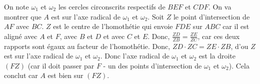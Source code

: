 \begin{sol}
\begin{center}
\end{center}

On note $\omega_1$ et $\omega_2$ les cercles circonscrits respectifs de $BEF$ et $CDF$. On va montrer que $A$ est sur l'axe radical de $\omega_1$ et $\omega_2$. Soit $Z$ le point d'intersection de $AF$ avec $BC$. $Z$ est le centre de l'homothétie qui envoie $FDE$ sur $ABC$ car il est aligné avec $A$ et $F$, avec $B$ et $D$ et avec $C$ et $E$. Donc, $\frac{ZD}{ZB} = \frac{ZE}{ZC}$, car ces deux rapports sont égaux au facteur de l'homothétie. Donc, $ZD \cdot ZC = ZE \cdot ZB$, d'ou $Z$ est sur l'axe radical de $\omega_1$ et $\omega_2$. Donc l'axe radical de $\omega_1$ et $\omega_2$ est la droite $\left(FZ\right)$ (car il doit passer par $F$ - un des points d'intersection de $\omega_1$ et $\omega_2$). Cela conclut car $A$ est bien sur $\left(FZ\right)$.
\end{sol}


